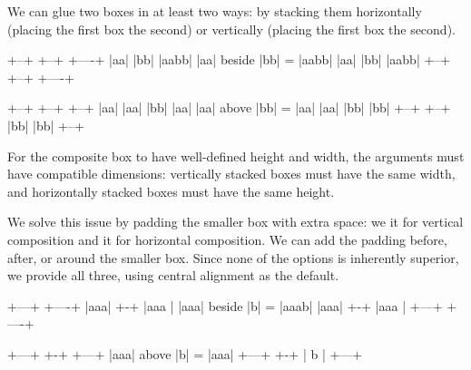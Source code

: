 \documentclass{article}
\begin{document}
We can glue two boxes in at least two ways:
by stacking them horizontally (placing the first box \href{#ref-beside}{} the second)
or vertically (placing the first box \href{#ref-above}{} the second).

\begin{code}
+--+        +--+   +----+
|aa|        |bb|   |aabb|
|aa| beside |bb| = |aabb|
|aa|        |bb|   |aabb|
+--+        +--+   +----+

                    +--+
+--+         +--+   |aa|
|aa|         |bb|   |aa|
|aa|  above  |bb| = |aa|
|aa|         |bb|   |bb|
+--+         +--+   |bb|
                    |bb|
                    +--+
\end{code}

For the composite box to have well-defined height and width, the arguments must have compatible dimensions:
vertically stacked boxes must have the same width, and horizontally stacked boxes must have the same height.

We solve this issue by padding the smaller box with extra space:
we \href{#ref-widen}{} it for vertical composition
and \href{#ref-heighten}{} it for horizontal composition.
We can add the padding before, after, or around the smaller box.
Since none of the options is inherently superior, we provide all three, using central alignment as the default.

\begin{code}
+---+              +----+
|aaa|        +-+   |aaa |
|aaa| beside |b| = |aaab|
|aaa|        +-+   |aaa |
+---+              +----+

+---+         +-+   +---+
|aaa|  above  |b| = |aaa|
+---+         +-+   | b |
                    +---+
\end{code}
\end{document}
